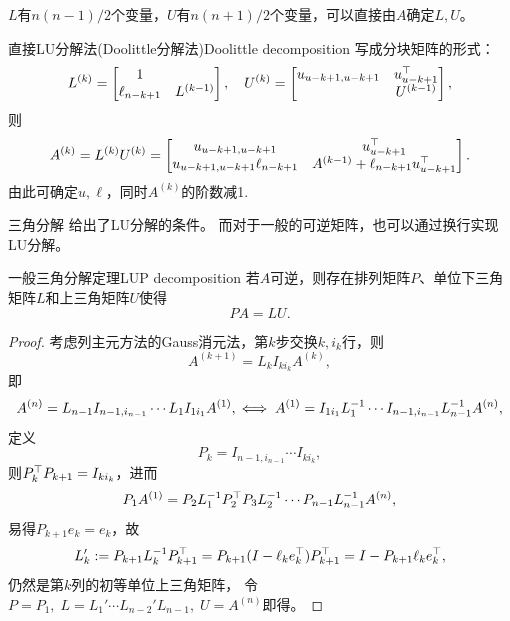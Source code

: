 \begin{remark}
    $L$有$n(n-1)/2$个变量，$U$有$n(n+1)/2$个变量，可以直接由$A$确定$L,U$。
\end{remark}

\begin{theorem}
    {直接LU分解法(Doolittle分解法)}{Doolittle decomposition}
    写成分块矩阵的形式：
    \[
        L^{(k)}=\begin{bmatrix}
            1\\\ell_{n-k+1}&L^{(k-1)}
        \end{bmatrix},\quad
        U^{(k)}=\begin{bmatrix}
            u_{u-k+1,u-k+1}&u_{u-k+1}^\top\\ &U^{(k-1)}
        \end{bmatrix},
    \]
    则
    \[
        A^{(k)}=L^{(k)}U^{(k)}=\begin{bmatrix}
            u_{u-k+1,u-k+1}&u_{u-k+1}^\top\\
            u_{u-k+1,u-k+1}\ell_{n-k+1}&A^{(k-1)}+\ell_{n-k+1}u_{u-k+1}^\top
        \end{bmatrix}.
    \]
    由此可确定$u,\ell$，同时$A^{(k)}$的阶数减1.
\end{theorem}
    
\begin{remark}
    三角分解 给出了LU分解的条件。
    而对于一般的可逆矩阵，也可以通过换行实现LU分解。
\end{remark}

\begin{theorem}
    {一般三角分解定理}{LUP decomposition}
    若$A$可逆，则存在排列矩阵$P$、单位下三角矩阵$L$和上三角矩阵$U$使得
    \begin{equation}
        PA=LU.
    \end{equation}
\end{theorem}

\begin{proof}
    考虑列主元方法的Gauss消元法，第$k$步交换$k,i_k$行，则
    \[
        A^{(k+1)}=L_kI_{ki_k}A^{(k)},
    \]
    即
    \[
        A^{(n)}=L_{n-1}I_{n-1,i_{n-1}}\cdots L_1I_{1i_1}A^{(1)},
        \iff
        A^{(1)}=I_{1i_1}L_1^{-1}\cdots I_{n-1,i_{n-1}}L_{n-1}^{-1} A^{(n)},
    \]
    定义
    \[
        P_k=I_{n-1,i_{n-1}}\cdots I_{ki_k},
    \]
    则$P_k^\top P_{k+1}=I_{ki_k}$，进而
    \[
        P_1A^{(1)}=P_2L_1^{-1} P_2^\top P_3L_2^{-1}\cdots P_{n-1}L_{n-1}^{-1} A^{(n)},
    \]
    易得$P_{k+1}e_k=e_k$，故
    \[
        L_k':=P_{k+1}L_k^{-1} P_{k+1}^\top=P_{k+1}(I-\ell_ke_k^\top)P_{k+1}^\top=I-P_{k+1}\ell_ke_k^\top,
    \]
    仍然是第$k$列的初等单位上三角矩阵，
    令$P=P_1,\;L=L_1'\cdots L_{n-2}'L_{n-1},\;U=A^{(n)}$即得。
\end{proof}

